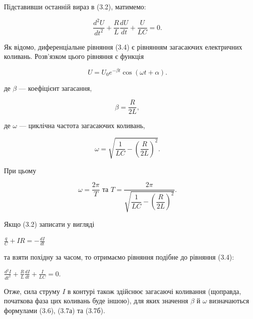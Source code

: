 \documentclass[12pt,a4paper]{article}
\begin{document}
    Підставивши останній вираз в (3.2), матимемо:

    \begin{equation}
        \frac{d^2U}{dt^2} + \frac{R}{L} \frac{dU}{dt} + \frac{U}{LC} = 0.
        \tag{3.4}
    \end{equation}

    Як відомо, диференціальне рівняння (3.4) є рівнянням загасаючих електричних коливань.
    Розв’язком цього рівняння є функція

    \begin{equation}
        U = U_0e^{-\beta t} \cos(\omega t + \alpha).
        \tag{3.5}
    \end{equation}

    де $\beta$ --- коефіцієнт загасання,

    \begin{equation}
        \beta = \frac{R}{2L},
        \tag{3.6}
    \end{equation}

    де $\omega$ --- циклічна частота загасаючих коливань,

    \begin{equation}
        \omega = \sqrt{\frac{1}{LC} - \left( \frac{R}{2L}\right)^2}.
        \tag{3.7а}
    \end{equation}

    При цьому

    \begin{equation}
        \omega = \frac{2\pi}{T} \text{  та  } T = \frac{2\pi}{\sqrt{\dfrac{1}{LC} - \left( \dfrac{R}{2L}\right)^2}}.
        \tag{3.7б}
    \end{equation}

    Якщо (3.2) записати у вигляді

    \begin{center}
        $\displaystyle \frac{q}{C} + IR = -\frac{dI}{dt}$
    \end{center}

    та взяти похідну за часом, то отримаємо рівняння подібне до рівняння (3.4):

    \begin{center}
        $\displaystyle \frac{d^2I}{dt^2} + \frac{R}{L} \frac{dI}{dt} + \frac{I}{LC} = 0$.
    \end{center}

    Отже, сила струму $I$ в контурі також здійснює загасаючі коливання (щоправда, початкова фаза цих коливань буде іншою),
    для яких значення $\beta$ й $\omega$ визначаються формулами (3.6), (3.7а) та (3.7б).
\end{document}
